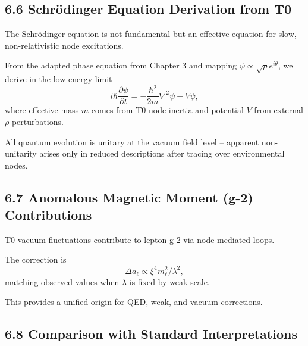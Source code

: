 \documentclass[12pt,a4paper]{article}
\begin{document}
	\subsection{6.6 Schrödinger Equation Derivation from T0}
	
	The Schrödinger equation is not fundamental but an effective equation for slow, non-relativistic node excitations.
	
	From the adapted phase equation from Chapter 3 and mapping $\psi \propto \sqrt{\rho} e^{i\theta}$, we derive in the low-energy limit
	\[
	i \hbar \frac{\partial \psi}{\partial t} = -\frac{\hbar^2}{2m} \nabla^2 \psi + V \psi,
	\]
	where effective mass $m$ comes from T0 node inertia and potential $V$ from external $\rho$ perturbations.
	
	All quantum evolution is unitary at the vacuum field level – apparent non-unitarity arises only in reduced descriptions after tracing over environmental nodes.
	
	\subsection{6.7 Anomalous Magnetic Moment (g-2) Contributions}
	
	T0 vacuum fluctuations contribute to lepton g-2 via node-mediated loops.
	
	The correction is
	\[
	\Delta a_\ell \propto \xi^4 m_\ell^2 / \lambda^2,
	\]
	matching observed values when $\lambda$ is fixed by weak scale.
	
	This provides a unified origin for QED, weak, and vacuum corrections.
	
	\subsection{6.8 Comparison with Standard Interpretations}
	
	\begin{table}[htbp]
		\centering
		\caption{Quantum interpretation comparison}
		\label{tab:quantum}
	\end{table}
	
\end{document}
